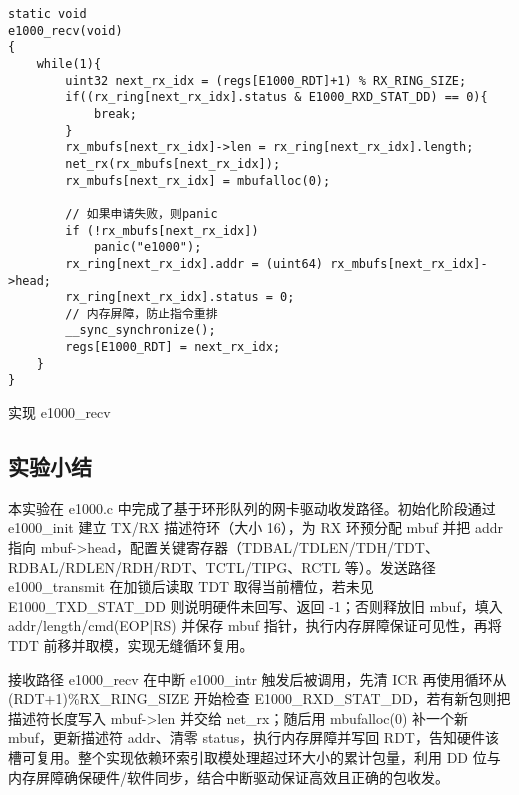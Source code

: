 \begin{listing}[!htb]
	\begin{verbatim}
static void
e1000_recv(void)
{
    while(1){
        uint32 next_rx_idx = (regs[E1000_RDT]+1) % RX_RING_SIZE;
        if((rx_ring[next_rx_idx].status & E1000_RXD_STAT_DD) == 0){
            break;
        }
        rx_mbufs[next_rx_idx]->len = rx_ring[next_rx_idx].length;
        net_rx(rx_mbufs[next_rx_idx]);
        rx_mbufs[next_rx_idx] = mbufalloc(0);
        
        // 如果申请失败，则panic
        if (!rx_mbufs[next_rx_idx])
            panic("e1000");
        rx_ring[next_rx_idx].addr = (uint64) rx_mbufs[next_rx_idx]->head;
        rx_ring[next_rx_idx].status = 0;
        // 内存屏障，防止指令重排
        __sync_synchronize();
        regs[E1000_RDT] = next_rx_idx;
    }
}
	\end{verbatim}
	\caption{实现 e1000\_recv}\label{lst:e1000_recv}
\end{listing}

\subsection{实验小结}

本实验在 e1000.c 中完成了基于环形队列的网卡驱动收发路径。初始化阶段通过 e1000\_init 建立 TX/RX 描述符环（大小 16），为 RX 环预分配 mbuf 并把 addr 指向 mbuf->head，配置关键寄存器（TDBAL/TDLEN/TDH/TDT、RDBAL/RDLEN/RDH/RDT、TCTL/TIPG、RCTL 等）。发送路径 e1000\_transmit 在加锁后读取 TDT 取得当前槽位，若未见 E1000\_TXD\_STAT\_DD 则说明硬件未回写、返回 -1；否则释放旧 mbuf，填入 addr/length/cmd(EOP|RS) 并保存 mbuf 指针，执行内存屏障保证可见性，再将 TDT 前移并取模，实现无缝循环复用。

接收路径 e1000\_recv 在中断 e1000\_intr 触发后被调用，先清 ICR 再使用循环从 (RDT+1)\%RX\_RING\_SIZE 开始检查 E1000\_RXD\_STAT\_DD，若有新包则把描述符长度写入 mbuf->len 并交给 net\_rx；随后用 mbufalloc(0) 补一个新 mbuf，更新描述符 addr、清零 status，执行内存屏障并写回 RDT，告知硬件该槽可复用。整个实现依赖环索引取模处理超过环大小的累计包量，利用 DD 位与内存屏障确保硬件/软件同步，结合中断驱动保证高效且正确的包收发。